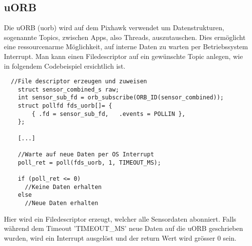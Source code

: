 \subsection{uORB}

Die uORB (\acrlong{uorb}) wird auf dem Pixhawk verwendet um Datenstrukturen, sogenannte Topics, zwischen Apps, also Threads, auszutauschen. Dies ermöglicht eine ressourcenarme Möglichkeit, auf interne Daten zu warten per Betriebssystem Interrupt.
Man kann einen Filedescriptor auf ein gewünschte Topic anlegen, wie in folgendem Codebeispiel ersichtlich ist. 

\begin{lstlisting}
  //File descriptor erzeugen und zuweisen
	struct sensor_combined_s raw;
	int sensor_sub_fd = orb_subscribe(ORB_ID(sensor_combined));
	struct pollfd fds_uorb[]= {
		{ .fd = sensor_sub_fd,   .events = POLLIN },
	};
	
    [...]
  
	//Warte auf neue Daten per OS Interrupt
	poll_ret = poll(fds_uorb, 1, TIMEOUT_MS);
	
	if (poll_ret <= 0)
	  //Keine Daten erhalten
	else
	  //Neue Daten erhalten

\end{lstlisting}


\noindent
Hier wird ein Filedescriptor erzeugt, welcher alle Sensordaten abonniert. Falls während dem Timeout 'TIMEOUT\_MS' neue Daten auf die uORB geschrieben wurden, wird ein Interrupt ausgelöst und der return Wert wird grösser 0 sein.

